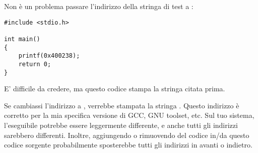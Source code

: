 Non è un problema passare l'indirizzo della stringa di test  a :

\begin{lstlisting}[style=customc]
#include <stdio.h>

int main()
{
    printf(0x400238);
    return 0;
}
\end{lstlisting}

E' difficile da credere, ma questo codice stampa la stringa citata prima.

Se cambiassi l'indirizzo a , verrebbe stampata la stringa .
Questo indirizzo è corretto per la mia specifica versione di GCC, GNU toolset, etc.
Sul tuo sistema, l'eseguibile potrebbe essere leggermente differente, e anche tutti gli indirizzi sarebbero differenti.
Inoltre, aggiungendo o rimuovendo del codice in/da questo codice sorgente probabilmente sposterebbe tutti gli indirizzi in avanti o indietro.
